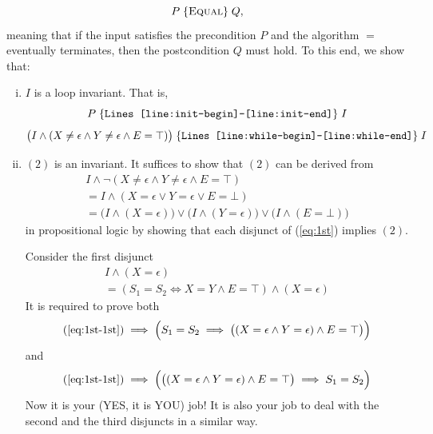 \[
  P \;\{\textsc{Equal}\}\; Q,
\]
meaning that if the input satisfies the precondition $P$
and the algorithm $\equal$ eventually terminates,
then the postcondition $Q$ must hold.
To this end, we show that:



\begin{enumerate}[(i)]
  \item $I$ is a loop invariant. That is,
    \[
      P \;\{\texttt{Lines~\ref{line:init-begin}--\ref{line:init-end}}\}\; I
    \]
    \[
      \big(I \land (X \neq \epsilon \land Y \neq \epsilon \land E = \top)\big) \;\{\texttt{Lines~\ref{line:while-begin}--\ref{line:while-end}}\}\; I
    \]
  \item $(2)$ is an invariant. It suffices to show that $(2)$ can be derived from
    \renewcommand{\theequation}{\alph{equation}}
    \setcounter{equation}{0}
    \begin{gather}
      I \land \lnot (X \neq \epsilon \land Y \neq \epsilon \land E = \top) \nonumber\\
      = I \land (X = \epsilon \lor Y = \epsilon \lor E = \bot) \nonumber\\ 
      = \big(I \land (X = \epsilon)\big) \lor \big(I \land (Y = \epsilon)\big) \lor \big(I \land (E = \bot)\big) \label{eq:1st}
    \end{gather}
    in propositional logic by showing that each disjunct of (\ref{eq:1st}) implies $(2)$.

    Consider the first disjunct
    \renewcommand{\theequation}{\alph{equation}1}
    \setcounter{equation}{0}
    \begin{gather}
      I \land (X = \epsilon) \nonumber\\ 
      = (S_1 = S_2 \iff X = Y \land E = \top) \land (X = \epsilon)  \label{eq:1st-1st}
    \end{gather}
    It is required to prove both 
    \[
      \text{(\ref{eq:1st-1st})} \implies \Big(S_1 = S_2 \implies \big((X = \epsilon \land Y = \epsilon) \land E = \top \big)\Big)
    \]
    and 
    \[
      \text{(\ref{eq:1st-1st})} \implies \Big(\big((X = \epsilon \land Y = \epsilon) \land E = \top \big) \implies S_1 = S_2 \Big)
    \]
    Now it is your (YES, it is YOU) job! It is also your job to deal with the second and the third disjuncts in a similar way.


\end{enumerate}
